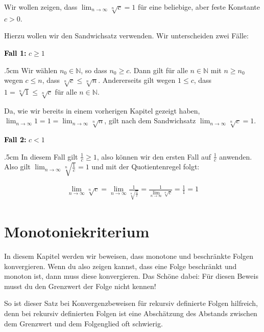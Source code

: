 \documentclass[fontsize=9pt,
               parskip=half-,
               DIV=14,
               listof=chapterentry,
               tocflat]{scrbook}
\newenvironment{indentblock}{\begin{adjustwidth}{.5cm}{}}{\end{adjustwidth}}
\newcommand{\proofcase}[2]{\textbf{\textcolor{Black}{Fall #1:}} #2}
\begin{document}
\begin{example*}
Wir wollen zeigen, dass $\lim _{n\to \infty }{\sqrt[{n}]{c}}=1$ für eine beliebige, aber feste Konstante $c>0$.

Hierzu wollen wir den Sandwichsatz verwenden. Wir unterscheiden zwei Fälle:

\proofcase{1}{$c\geq 1$}
\begin{indentblock}
Wir wählen $n_{0}\in \mathbb {N} $, so dass $n_{0}\geq c$. Dann gilt für alle $n\in \mathbb {N} $ mit $n\geq n_{0}$ wegen $c\leq n$, dass ${\sqrt[{n}]{c}}\leq {\sqrt[{n}]{n}}$. Andererseits gilt wegen $1\leq c$, dass $1={\sqrt[{n}]{1}}\leq {\sqrt[{n}]{c}}$ für alle $n\in \mathbb {N} $.

Da, wie wir bereits in einem vorherigen Kapitel gezeigt haben, $\lim _{n\to \infty }1=1=\lim _{n\to \infty }{\sqrt[{n}]{n}}$, gilt nach dem Sandwichsatz $\lim _{n\to \infty }{\sqrt[{n}]{c}}=1$.

\end{indentblock}

\proofcase{2}{$c<1$}
\begin{indentblock}
In diesem Fall gilt ${\tfrac {1}{c}}\geq 1$, also können wir den ersten Fall auf ${\tfrac {1}{c}}$ anwenden. Also gilt $\lim _{n\to \infty }{\sqrt[{n}]{\tfrac {1}{c}}}=1$ und mit der Quotientenregel folgt:

\begin{align*}
\lim _{n\to \infty }{\sqrt[{n}]{c}}=\lim _{n\to \infty }{\frac {1}{\sqrt[{n}]{\frac {1}{c}}}}={\frac {1}{\lim _{n\to \infty }{\sqrt[{n}]{c}}}}={\frac {1}{1}}=1
\end{align*}

\end{indentblock}

\end{example*}

\chapter{Monotoniekriterium}

In diesem Kapitel werden wir beweisen, dass monotone und beschränkte Folgen konvergieren. Wenn du also zeigen kannst, dass eine Folge beschränkt und monoton ist, dann muss diese konvergieren. Das Schöne dabei: Für diesen Beweis musst du den Grenzwert der Folge nicht kennen!

So ist dieser Satz bei Konvergenzbeweisen für rekursiv definierte Folgen hilfreich, denn bei rekursiv definierten Folgen ist eine Abschätzung des Abstands zwischen dem Grenzwert und dem Folgenglied oft schwierig.
\end{document}
